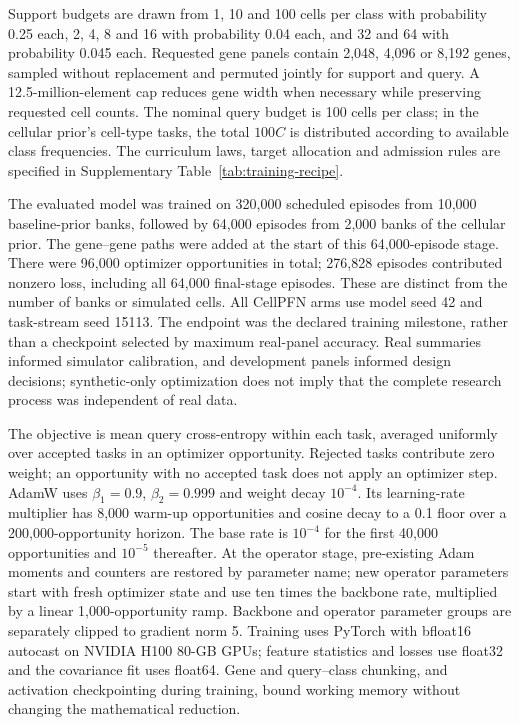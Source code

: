 Support budgets are drawn from 1, 10 and 100 cells per class with probability 0.25 each, 2, 4, 8 and 16 with probability 0.04 each, and 32 and 64 with probability 0.045 each. Requested gene panels contain 2,048, 4,096 or 8,192 genes, sampled without replacement and permuted jointly for support and query. A 12.5-million-element cap reduces gene width when necessary while preserving requested cell counts. The nominal query budget is 100 cells per class; in the cellular prior's cell-type tasks, the total $100C$ is distributed according to available class frequencies. The curriculum laws, target allocation and admission rules are specified in Supplementary Table~\ref{tab:training-recipe}.

The evaluated model was trained on 320,000 scheduled episodes from 10,000 baseline-prior banks, followed by 64,000 episodes from 2,000 banks of the cellular prior. The gene--gene paths were added at the start of this 64,000-episode stage. There were 96,000 optimizer opportunities in total; 276,828 episodes contributed nonzero loss, including all 64,000 final-stage episodes. These are distinct from the number of banks or simulated cells. All CellPFN arms use model seed 42 and task-stream seed 15113. The endpoint was the declared training milestone, rather than a checkpoint selected by maximum real-panel accuracy. Real summaries informed simulator calibration, and development panels informed design decisions; synthetic-only optimization does not imply that the complete research process was independent of real data.

The objective is mean query cross-entropy within each task, averaged uniformly over accepted tasks in an optimizer opportunity. Rejected tasks contribute zero weight; an opportunity with no accepted task does not apply an optimizer step. AdamW\citep{loshchilov2019adamw} uses $\beta_1=0.9$, $\beta_2=0.999$ and weight decay $10^{-4}$. Its learning-rate multiplier has 8,000 warm-up opportunities and cosine decay to a 0.1 floor over a 200,000-opportunity horizon. The base rate is $10^{-4}$ for the first 40,000 opportunities and $10^{-5}$ thereafter. At the operator stage, pre-existing Adam moments and counters are restored by parameter name; new operator parameters start with fresh optimizer state and use ten times the backbone rate, multiplied by a linear 1,000-opportunity ramp. Backbone and operator parameter groups are separately clipped to gradient norm 5. Training uses PyTorch\citep{paszke2019pytorch} with bfloat16 autocast on NVIDIA H100 80-GB GPUs; feature statistics and losses use float32 and the covariance fit uses float64. Gene and query--class chunking, and activation checkpointing during training, bound working memory without changing the mathematical reduction.

